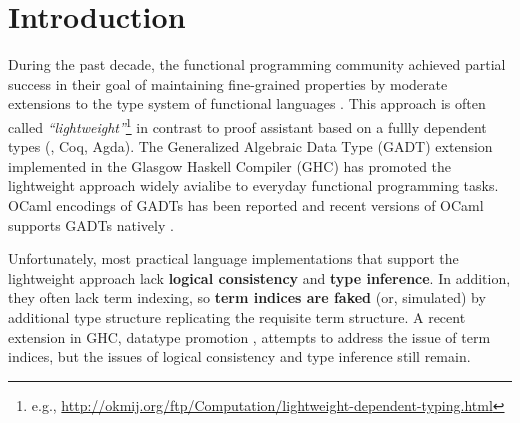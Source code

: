 \section{Introduction}
During the past decade, the functional programming community achieved
partial success in their goal of maintaining fine-grained properties
by moderate extensions to the type system of functional languages
\cite{CheHin03,CheHin02,Xi03}.
This approach is often called \emph{``lightweight''}\footnote{e.g.,
  \url{http://okmij.org/ftp/Computation/lightweight-dependent-typing.html} }
in contrast to proof assistant based on a fullly dependent types
(\eg, Coq, Agda).
The Generalized Algebraic Data Type (GADT) extension implemented
in the Glasgow Haskell Compiler (GHC) has promoted the lightweight approach
widely avialibe to everyday functional programming tasks.
OCaml encodings of GADTs has been reported \cite{ManStu09}
and recent versions of OCaml supports GADTs natively \cite{GarNor11}.

Unfortunately, most practical language implementations that support
the lightweight approach lack \textbf{logical consistency} and
\textbf{type inference}. In addition, they often lack term indexing,
so \textbf{term indices are faked} (or, simulated) by additional
type structure replicating the requisite term structure.
A recent extension in GHC, datatype promotion \cite{YorgeyWCJVM12},
attempts to address the issue of term indices, but the issues of
logical consistency and type inference still remain.

